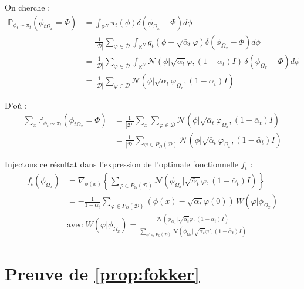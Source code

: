 \documentclass[a4paper,10pt]{article}
\theoremstyle{definition} %
\theoremstyle{definition} %
\theoremstyle{definition} %
\theoremstyle{definition} %
\begin{document}
On cherche :
\begin{align*}
    \mathbb{P}_{\phi_t \sim \pi_t} \left( \phi_{t\Omega_x} = \Phi \right) &=
\int_{\mathbb{R}^N} \pi_t(\phi) \delta(\phi_{\Omega_x} - \Phi) d\phi \\
& = \frac{1}{|\mathcal{D}|} \sum\limits_{\varphi \in \mathcal{D}} \int_{\mathbb{R}^N} g_t (\phi - \sqrt{\bar \alpha_t} \varphi) \delta(\phi_{\Omega_x} - \Phi) d\phi\\
&= \frac{1}{|\mathcal{D}|} \sum\limits_{\varphi \in \mathcal{D}} \int_{\mathbb{R}^N} \mathcal{N} (\phi | \sqrt{\bar \alpha_t} \varphi, (1 - \bar \alpha_t) I)\, \delta(\phi_{\Omega_x} - \Phi) d\phi\\
&= \frac{1}{|\mathcal{D}|} \sum\limits_{\varphi \in \mathcal{D}} \mathcal{N} (\phi | \sqrt{\bar \alpha_t} \varphi_{\Omega_x}, (1 - \bar \alpha_t) I)
\end{align*}

D’où :
\begin{align*}
    \sum\limits_x \mathbb{P}_{\phi_t \sim \pi_t} \left( \phi_{t\Omega_x} = \Phi \right) &= \frac{1}{|\mathcal{D}|} \sum\limits_x \sum\limits_{\varphi \in \mathcal{D}} \mathcal{N} (\phi | \sqrt{\bar \alpha_t} \varphi_{\Omega_x}, (1 - \bar \alpha_t) I)\\
    &=\frac{1}{|\mathcal{D}|} \sum\limits_{\varphi \in P_\Omega(\mathcal{D})} \mathcal{N} (\phi | \sqrt{\bar \alpha_t} \varphi_{\Omega_x}, (1 - \bar \alpha_t) I)
\end{align*}

Injectons ce résultat dans l’expression de l’optimale fonctionnelle \( f_t \) :
\begin{align*}
f_t(\phi_{\Omega_x}) &= \nabla_{\phi(x)} \left\{ \sum\limits_{\varphi \in P_\Omega(\mathcal{D})} \mathcal{N} (\phi_{\Omega_x} | \sqrt{\bar \alpha_t} \varphi, (1 - \bar \alpha_t) I) \right\}\\
&= -\frac{1}{1 - \bar \alpha_t}\sum\limits_{\varphi \in P_\Omega(\mathcal{D})}  \left(\phi(x) - \sqrt{\bar \alpha_t} \varphi(0)\right)\, W(\varphi | \phi_{\Omega_x})\\
& \text{avec } W(\varphi | \phi_{\Omega_x}) = \frac{\mathcal{N} (\phi_{\Omega_x} | \sqrt{\bar \alpha_t} \varphi, (1 - \bar \alpha_t) I)}
{\sum\limits_{\varphi' \in P_\Omega(\mathcal{D})} \mathcal{N} (\phi_{\Omega_x} | \sqrt{\bar \alpha_t} \varphi', (1 - \bar \alpha_t) I)}
\end{align*}

\appendix

\section{Preuve de \cref{prop:fokker} \label{sec:proof_focker}}
\end{document}
